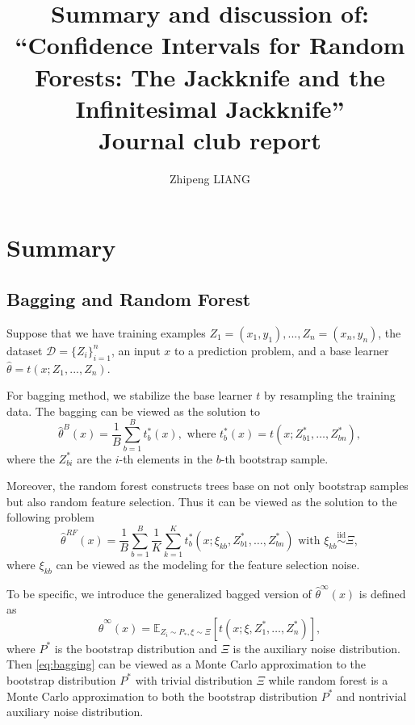\documentclass[11pt]{article}
\title{Summary and discussion of: ``Confidence Intervals for Random Forests: The Jackknife and the Infinitesimal Jackknife'' \\
{\large Journal club report}}
\author{Zhipeng LIANG}
\date{}
\begin{document}
\maketitle

\section{Summary}
\subsection{Bagging and Random Forest}
Suppose that we have training examples $Z_1 = (x_1, y_1), ..., Z_n = (x_n, y_n)$, the dataset $\mathcal{D}=\{Z_i\}_{i=1}^n$, an input $x$ to a prediction problem, and a base learner $\hat{\theta} = t(x;Z_1, ..., Z_n)$.

For bagging method, we stabilize the base learner $t$ by resampling the training data. 
The bagging can be viewed as the solution to 
\begin{equation}
	\label{eq:bagging}
	\hat{\theta}^{B}(x)=\frac{1}{B} \sum_{b=1}^{B} t_{b}^{*}(x), \text { where } t_{b}^{*}(x)=t\left(x ; Z_{b 1}^{*}, \ldots, Z_{b n}^{*}\right),
\end{equation}
where the $Z^{*}_{bi}$ are the $i$-th elements in the $b$-th bootstrap sample.

Moreover, the random forest constructs trees base on not only bootstrap samples but also random feature selection.
Thus it can be viewed as the solution to the following problem 
\begin{equation}
	\label{eq:random-forest}
	\hat{\theta}^{R F}(x)=\frac{1}{B} \sum_{b=1}^{B} \frac{1}{K} \sum_{k=1}^{K} t_{b}^{*}\left(x ; \xi_{k b}, Z_{b 1}^{*}, \ldots, Z_{b n}^{*}\right) \text{ with } \xi_{k b} \stackrel{\mathrm{iid}}{\sim} \Xi,
\end{equation}
where $\xi_{kb}$ can be viewed as the modeling for the feature selection noise.


To be specific, we introduce the generalized bagged version of $\hat{\theta}^{\infty}(x)$ is defined as 
\begin{equation}
	\label{eq:bagged-version}
	\hat{\theta}^{\infty}(x)=\mathbb{E}_{Z_i\sim P_{*}, \xi \sim \Xi}\left[t\left(x; \xi, Z_{1}^{*}, \ldots, Z_{n}^{*}\right)\right],
\end{equation}
where $P^{*}$ is the bootstrap distribution and $\Xi$ is the auxiliary noise distribution. 
Then \eqref{eq:bagging} can be viewed as a Monte Carlo approximation to the bootstrap distribution $P^{*}$ with trivial distribution $\Xi$ while random forest is a Monte Carlo approximation to both the bootstrap distribution $P^{*}$ and nontrivial auxiliary noise distribution.
\end{document}
